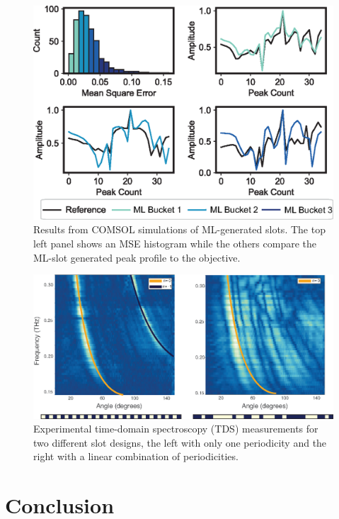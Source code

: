 \documentclass[11pt]{article}
\begin{document}
\begin{figure}[H]
	\centering
	\includegraphics{figures/fig2_labeled.eps}
	\caption{Results from COMSOL simulations of ML-generated slots. The top left panel shows an MSE histogram while the others compare the ML-slot generated peak profile to the objective.}
\end{figure}


\begin{figure}[H]
	\centering
	\includegraphics{figures/exp-fig1.eps}
	\caption{Experimental time-domain spectroscopy (TDS) measurements for two different slot designs, the left with only one periodicity and the right with a linear combination of periodicities.}
\end{figure}

\section*{Conclusion}



\end{document}
